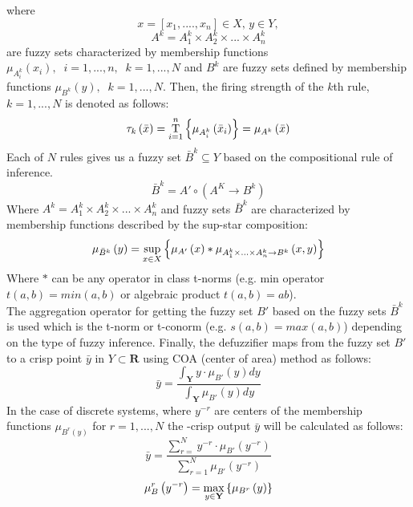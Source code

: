 where
$$x=\left[x_{1},....,x_{n}\right] \in X,\,y\in Y,$$
$$A^{k}=A_{1}^{k}\times A_{2}^{k}\times ... \times A_{n}^{k}$$
are fuzzy sets characterized by membership functions $\mu_{A_{i}^{k}}\left(x_{i}\right),\;\;i=1,...,n,\;\;k=1,...,N$
and $B^{k}$ are fuzzy sets defined by membership functions $\mu_{B^{k}}\left (y\right),\;\;k=1,...,N$.
Then, the firing strength of the $k$th rule, $k=1,...,N$ is denoted as follows:
\begin{equation}
    \tau _{k}\left(\bar{x} \right )=\operatornamewithlimits{T}_{i=1}^{n}\left \{ \mu_{A_{i}^{k}}\left ( \bar{x}_{i} \right ) \right \}= \mu_{A^{k}}\left ( \bar{x} \right )
\end{equation}
Each of $N$ rules gives us a fuzzy set $\bar{B}^{k}\subseteq Y$ based on the compositional rule of inference.
\begin{equation}
    \bar{B}^{k}={A}'\circ \left(A^{K}\rightarrow B^{k}\right)
\end{equation}
Where $A^{k}=A_{1}^{k}\times A_{2}^{k}\times...\times A_{n}^{k}$ and fuzzy sets $\bar{B}^{k}$ are characterized by membership functions described by the sup-star composition:
\begin{equation}
   \mu_{\bar{B}^{k}}\left(y\right)=\operatornamewithlimits{sup}_{x \in X} \left \{ \mu_{{A}'}\left(x \right )\ast \mu_{A_{1}^{k}\times ... \times A_{n}^{k}\rightarrow B^{k}}\left(x,y \right ) \right \} 
\end{equation}
Where $\ast$ can be any operator in class t-norms (e.g. min operator $t\left( a,b\right)=min\left(a,b\right)$ or algebraic product $t\left(a,b\right)=ab$).\\
The aggregation operator for getting the fuzzy set ${B}'$ based on the fuzzy sets $\bar{B}^{k}$ is used which is the t-norm or t-conorm (e.g. $s\left(a,b\right)=max\left(a,b\right)$) depending on the type of fuzzy inference.
Finally, the defuzzifier maps from the fuzzy set ${B}'$ to a crisp point $\bar{y}$ in $Y\subset \mathbf{R}$ using COA (center of area) method as follows:
\begin{equation}
    \bar{y}= \frac{\int_{\mathbf{Y}}^{}y\cdot \mu_{{B}'}\left(y \right )dy}{\int_{\mathbf{Y}}^{}\mu_{{B}'}\left(y \right )dy}
\end{equation}
In the case of discrete systems, where $y^{-r}$ are centers of the membership functions $\mu_{B^{r}\left(y\right)}$ for $r=1,...,N$ the -crisp output $\bar{y}$ will be calculated as follows:
\begin{equation}
    \bar{y}=\frac{\sum_{r=}^{N}y^{-r}\cdot \mu_{{B}'}\left(y^{-r} \right )}{\sum_{r=1}^{N}\mu_{{B}'}\left(y^{-r} \right )}
\end{equation}
\begin{equation}
    \mu_{B}^{r}\left(y^{-r}\right)=\operatornamewithlimits{max}_{y\in\mathbf{Y}}\left\{\mu_{B^{r}}\left(y\right)\right\}
\end{equation}
